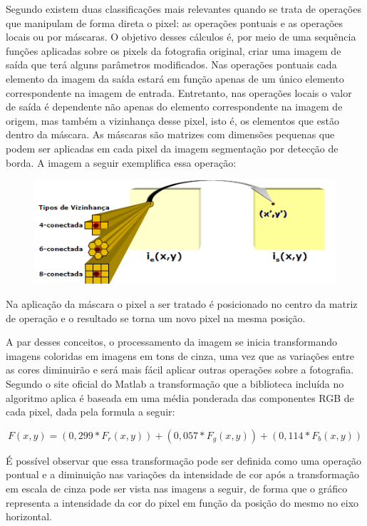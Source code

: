 \documentclass[12pt]{article}
\begin{document}
	Segundo \cite{de2006introduccao} existem duas classificações mais relevantes quando se trata de operações que manipulam de forma direta o pixel: as operações pontuais e as operações locais ou por máscaras. O objetivo desses cálculos é, por meio de uma sequência funções aplicadas sobre os pixels da fotografia original, criar uma imagem de saída que terá alguns parâmetros modificados. Nas operações pontuais cada elemento da imagem da saída estará em função apenas de um único elemento correspondente na imagem de entrada. Entretanto, nas operações locais o valor de saída é dependente não apenas do elemento correspondente na imagem de origem, mas também a vizinhança desse pixel, isto é, os elementos que estão dentro da máscara. As máscaras são matrizes com dimensões pequenas que podem ser aplicadas em cada pixel da imagem segmentação por detecção de borda. A imagem a seguir exemplifica essa operação:
	
	\begin{figure}[h!]
		\centering
		\includegraphics[width=0.7\linewidth]{img/f8d}
		\caption{}
		\label{fig:f8d}
	\end{figure}
	
	Na aplicação da máscara o pixel a ser tratado é posicionado no centro da matriz de operação e o resultado se torna um novo pixel na mesma posição. 
	
	A par desses conceitos, o processamento da imagem se inicia transformando imagens coloridas em imagens em tons de cinza, uma vez que as variações entre as cores diminuirão e será mais fácil aplicar outras operações sobre a fotografia. Segundo o site oficial do Matlab \cite{Matlab} a transformação que a biblioteca incluída no algoritmo aplica é baseada em uma média ponderada das componentes RGB de cada pixel, dada pela formula a seguir:
	
	\begin{equation}
	F(x,y)=(0,299*F_r(x,y))+(0,057*F_g(x,y))+(0,114*F_b(x,y))
	\end{equation} 
	
	É possível observar que essa transformação pode ser definida como uma operação pontual e a diminuição nas variações da intensidade de cor após a transformação em escala de cinza pode ser vista nas imagens a seguir, de forma que o gráfico representa a intensidade da cor do pixel em função da posição do mesmo no eixo horizontal. 
	
\end{document}
